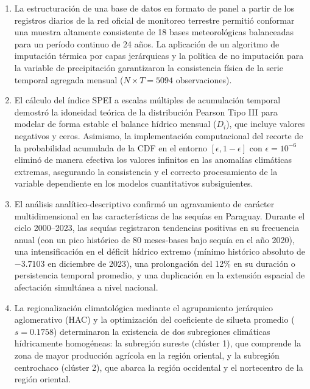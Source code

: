 \begin{enumerate}
    \item La estructuración de una base de datos en formato de panel a partir de los registros diarios de la red oficial de monitoreo terrestre permitió conformar una muestra altamente consistente de 18 bases meteorológicas balanceadas para un período continuo de 24 años. La aplicación de un algoritmo de imputación térmica por capas jerárquicas y la política de no imputación para la variable de precipitación garantizaron la consistencia física de la serie temporal agregada mensual ($N \times T = 5094$ observaciones).
    
    \item El cálculo del índice SPEI a escalas múltiples de acumulación temporal demostró la idoneidad teórica de la distribución Pearson Tipo III para modelar de forma estable el balance hídrico mensual ($D_i$), que incluye valores negativos y ceros. Asimismo, la implementación computacional del recorte de la probabilidad acumulada de la CDF en el entorno $[\epsilon, 1-\epsilon]$ con $\epsilon = 10^{-6}$ eliminó de manera efectiva los valores infinitos en las anomalías climáticas extremas, asegurando la consistencia y el correcto procesamiento de la variable dependiente en los modelos cuantitativos subsiguientes.
    
    \item El análisis analítico-descriptivo confirmó un agravamiento de carácter multidimensional en las características de las sequías en Paraguay. Durante el ciclo 2000--2023, las sequías registraron tendencias positivas en su frecuencia anual (con un pico histórico de 80 meses-bases bajo sequía en el año 2020), una intensificación en el déficit hídrico extremo (mínimo histórico absoluto de $-3.7103$ en diciembre de 2023), una prolongación del 12\% en su duración o persistencia temporal promedio, y una duplicación en la extensión espacial de afectación simultánea a nivel nacional.
    
    \item La regionalización climatológica mediante el agrupamiento jerárquico aglomerativo (HAC) y la optimización del coeficiente de silueta promedio ($s = 0.1758$) determinaron la existencia de dos subregiones climáticas hídricamente homogéneas: la subregión sureste (clúster 1), que comprende la zona de mayor producción agrícola en la región oriental, y la subregión centrochaco (clúster 2), que abarca la región occidental y el nortecentro de la región oriental.
    

\end{enumerate}
